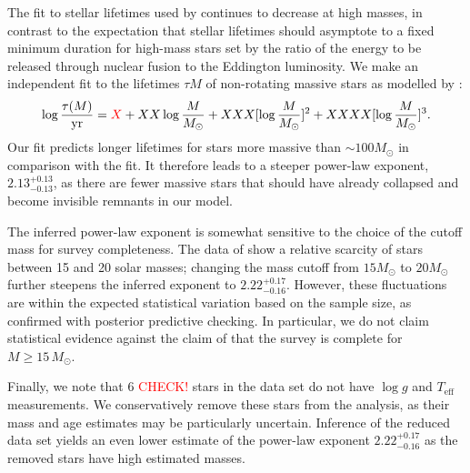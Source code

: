 \documentclass[apjl]{emulateapj}
\newcommand{\MSun}{M_\odot}
\newcommand{\ilya}[1]{\textcolor{red}{#1}}
\newcommand{\onesigrange}[3]{\ensuremath{#1^{+#2}_{-#3}}}
\newcommand{\alpharangetwo}{\onesigrange{2.13}{0.13}{0.13}}
\newcommand{\alpharangethree}{\onesigrange{2.22}{0.17}{0.16}}
\begin{document}
The fit to stellar lifetimes used by \citet{Schneider:2018} continues to decrease at high masses, in contrast to the expectation that stellar lifetimes should asymptote to a fixed minimum duration for high-mass stars set by the ratio of the energy to be released through nuclear fusion to the Eddington luminosity.  We make an independent fit to the lifetimes $\tau{M}$ of non-rotating massive stars as modelled by \citet{Brott:2011}:
\begin{equation}
\log \frac{\tau (M)}{\textrm{yr}} = \ilya{X} + XX \log\frac{M}{M_\odot} + XXX [\log\frac{M}{M_\odot}]^2 + XXXX [\log\frac{M}{M_\odot}]^3.
\end{equation}
Our fit predicts longer lifetimes for stars more massive than $\sim 100 M_\odot$ in comparison with the \citet{Schneider:2018} fit.  It therefore leads to a steeper power-law exponent, $\alpharangetwo$, as there are fewer massive stars that should have already collapsed and become invisible remnants in our model.    

The inferred power-law exponent is somewhat sensitive to
the choice of the cutoff mass for survey completeness.  The data of \citet{Schneider:2018} show a relative scarcity of stars between 15 and 20 solar masses; changing the mass cutoff from $15 M_\odot$ to $20 M_\odot$ further steepens the inferred exponent to $\alpharangethree$.    However, these fluctuations are within the expected statistical
variation based on the sample size, as confirmed with posterior predictive
checking.  In particular, we do not claim statistical evidence against the claim of \citet{Schneider:2018} that
the survey is complete for $M \geq 15 \, \MSun$.

Finally, we note that $6$ \ilya{CHECK!} stars in the \citet{Schneider:2018} data set do not have $\log g$ and $T_\textrm{eff}$ measurements.  We conservatively remove these stars from the analysis, as their mass and age estimates may be particularly uncertain.  Inference of the reduced data set yields an even lower estimate of the power-law exponent $\alpharangethree$ as the removed stars have high estimated masses.
\end{document}
